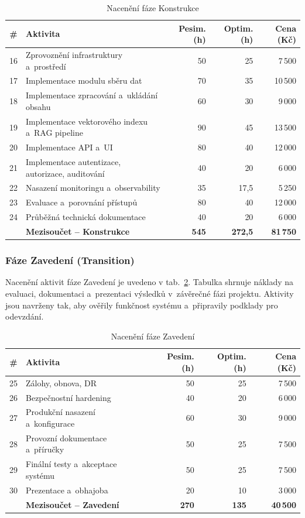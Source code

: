 \documentclass[a4paper, 11pt]{article}
\begin{document}
\begin{table}[H]
\centering\small
\begin{tabularx}{\textwidth}{c X r r r}
\toprule
\textbf{\#} & \textbf{Aktivita} & \textbf{Pesim. (h)} & \textbf{Optim. (h)} & \textbf{Cena (Kč)} \\
\midrule
16 & Zprovoznění infrastruktury a~prostředí & 50 & 25 & 7\,500 \\
17 & Implementace modulu sběru dat & 70 & 35 & 10\,500 \\
18 & Implementace zpracování a~ukládání obsahu & 60 & 30 & 9\,000 \\
19 & Implementace vektorového indexu a~RAG pipeline & 90 & 45 & 13\,500 \\
20 & Implementace API a~UI & 80 & 40 & 12\,000 \\
21 & Implementace autentizace, autorizace, auditování & 40 & 20 & 6\,000 \\
22 & Nasazení monitoringu a~observability & 35 & 17,5 & 5\,250 \\
23 & Evaluace a~porovnání přístupů & 80 & 40 & 12\,000 \\
24 & Průběžná technická dokumentace & 40 & 20 & 6\,000 \\
\midrule
& \textbf{Mezisoučet -- Konstrukce} & \textbf{545} & \textbf{272,5} & \textbf{81\,750} \\
\bottomrule
\end{tabularx}
\caption{Nacenění fáze Konstrukce}
\label{tab:cena-konstrukce}
\end{table}

\subsubsection{Fáze Zavedení (Transition)}

Nacenění aktivit fáze Zavedení je uvedeno v tab.~\ref{tab:cena-zavedeni}.
Tabulka shrnuje náklady na evaluaci, dokumentaci a~prezentaci výsledků v~závěrečné fázi projektu. Aktivity jsou navrženy tak, aby ověřily funkčnost systému a~připravily podklady pro odevzdání.

\begin{table}[H]
\centering\small
\begin{tabularx}{\textwidth}{c X r r r}
\toprule
\textbf{\#} & \textbf{Aktivita} & \textbf{Pesim. (h)} & \textbf{Optim. (h)} & \textbf{Cena (Kč)} \\
\midrule
25 & Zálohy, obnova, DR & 50 & 25 & 7\,500 \\
26 & Bezpečnostní hardening & 40 & 20 & 6\,000 \\
27 & Produkční nasazení a~konfigurace & 60 & 30 & 9\,000 \\
28 & Provozní dokumentace a~příručky & 50 & 25 & 7\,500 \\
29 & Finální testy a~akceptace systému & 50 & 25 & 7\,500 \\
30 & Prezentace a~obhajoba & 20 & 10 & 3\,000 \\
\midrule
& \textbf{Mezisoučet -- Zavedení} & \textbf{270} & \textbf{135} & \textbf{40\,500} \\
\bottomrule
\end{tabularx}
\caption{Nacenění fáze Zavedení}
\label{tab:cena-zavedeni}
\end{table}
\end{document}
